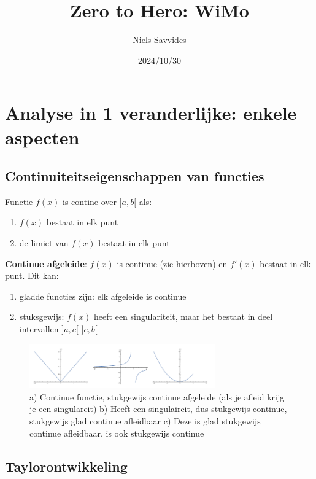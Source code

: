 \documentclass[a4paper]{article}
\title{Zero to Hero: WiMo}
\author{Niels Savvides}
\date{2024/10/30}
\begin{document}
\maketitle

\section{Analyse in 1 veranderlijke: enkele aspecten}

\subsection{Continuiteitseigenschappen van functies}

Functie $f(x)$ is contine over $]a,b[$ als:
\begin{enumerate}
	\item $f(x)$ bestaat in elk punt
	\item de limiet van $f(x)$ bestaat in elk punt
\end{enumerate}

\textbf{Continue afgeleide}: $f(x)$ is continue (zie hierboven) en $f'(x)$ bestaat in elk punt.
Dit kan:
\begin{enumerate}
	\item gladde functies zijn: elk afgeleide is continue
	\item stuksgewijs: $f(x)$ heeft een singulariteit, maar het bestaat in deel intervallen $]a, c[$ $]c, b[$
\end{enumerate}

\begin{figure}[!htbp]
	\begin{center}
		\includegraphics[width=8cm]{./images/continu.png}
	\end{center}
	\caption{a) Continue functie, stukgewijs continue afgeleide (als je afleid krijg je een singulareit) b) Heeft een singulaireit, dus stukgewijs continue, stukgewijs glad continue afleidbaar c) Deze is glad stukgewijs continue afleidbaar, is ook stukgewijs continue }
\end{figure}


\subsection{Taylorontwikkeling}
\label{sec:taylor}
\end{document}
